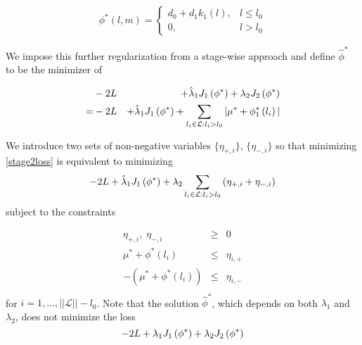 \documentclass[12pt]{article}
\newcommand{\lmr}{\fontfamily{lmr}\selectfont} %
\begin{document}
\[
\phi^*\left(l,m\right) = \left\{ \begin{array}{lr} d_0 + d_1 k_1\left(l\right), & l \le l_0 \\ 0, & l > l_0 \end{array} \right.
\]



We impose this further regularization from a stage-wise approach and define $\hat{\phi}^*$ to be the minimizer of 

\begin{eqnarray}
&-2\lmr{L}& + \hat{\lambda}_1J_1\left(\phi^*\right) + \lambda_2 J_2\left(\phi^*\right)\\
= &-2\lmr{L}& + \hat{\lambda}_1J_1\left(\phi^*\right) + \sum_{\relsize{-2} l_i \in \mathcal{L}: l_i > l_0} \vert \mu^* + \phi^*_1\left(l_i\right) \vert  \label{stage2loss}
\end{eqnarray}
\noindent



We introduce two sets of non-negative variables $\big \lbrace \eta_{+,i} \big \rbrace$, $\big \lbrace \eta_{-,i} \big \rbrace$ so that minimizing \eqref{stage2loss} is equivalent to minimizing 
\begin{eqnarray}
-2\lmr{L} + \hat{\lambda}_1J_1\left(\phi^*\right) + \lambda_2 \sum_{\relsize{-2} l_i \in \mathcal{L}: l_i > l_0} \left( \eta_{+,i} + \eta_{-,i} \right)  \label{stage2loss}
\end{eqnarray}
\noindent subject to the constraints

\begin{eqnarray*}
\eta_{+,i},\; \eta_{-,i} &\ge& 0 \\
\mu^* + \phi^*\left(l_i\right) &\le& \eta_{i,+}\\
-\left(\mu^* + \phi^*\left(l_i\right)\right) &\le& \eta_{i,-}\label{eta_constraints}\\
\end{eqnarray*}
\noindent
for $i=1,\dots,\vert \vert\mathcal{L}\vert \vert-l_0$. Note that the solution $\hat{\phi}^*$, which depends on both $\lambda_1$ and $\lambda_2$, does not minimize the loss
\[
-2\lmr{L} + \lambda_1J_1\left(\phi^*\right) + \lambda_2J_2\left(\phi^*\right) 
\]
\noindent
\end{document}
